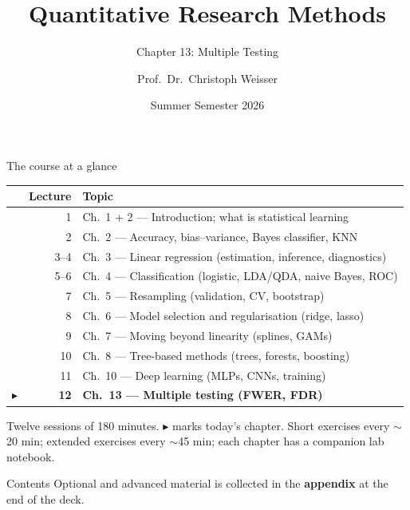 \documentclass[aspectratio=169,11pt]{beamer}
\title{Quantitative Research Methods}
\subtitle{Chapter 13: Multiple Testing}
\author{Prof.\ Dr.\ Christoph Weisser}\institute{HSBI}
\date{Summer Semester 2026}\graphicspath{{images/}}
\begin{document}
\begin{frame}[plain]\titlepage\end{frame}

\begin{frame}{The course at a glance}
  \footnotesize
  \begin{center}
  \begin{tabular}{@{}c r l@{}}
    & \textbf{Lecture} & \textbf{Topic}\\
    \midrule
     & 1 & Ch.\ 1 + 2 --- Introduction; what is statistical learning \\
     & 2 & Ch.\ 2 --- Accuracy, bias--variance, Bayes classifier, KNN \\
     & 3--4 & Ch.\ 3 --- Linear regression (estimation, inference, diagnostics) \\
     & 5--6 & Ch.\ 4 --- Classification (logistic, LDA/QDA, naive Bayes, ROC) \\
     & 7 & Ch.\ 5 --- Resampling (validation, CV, bootstrap) \\
     & 8 & Ch.\ 6 --- Model selection and regularisation (ridge, lasso) \\
     & 9 & Ch.\ 7 --- Moving beyond linearity (splines, GAMs) \\
     & 10 & Ch.\ 8 --- Tree-based methods (trees, forests, boosting) \\
     & 11 & Ch.\ 10 --- Deep learning (MLPs, CNNs, training) \\
    $\blacktriangleright$ & \textbf{12} & \textbf{Ch.\ 13 --- Multiple testing (FWER, FDR)} \\
  \end{tabular}
  \end{center}
  \vspace{2pt}
  {\scriptsize Twelve sessions of 180 minutes. $\blacktriangleright$ marks today's chapter. Short exercises every $\sim$20 min; extended exercises every $\sim$45 min; each chapter has a companion lab notebook.}
\end{frame}


\begin{frame}{Contents}\small\tableofcontents[hideallsubsections]
  \vfill
  {\tiny Optional and advanced material is collected in the \textbf{appendix} at the end of the deck.}
\end{frame}
\end{document}
